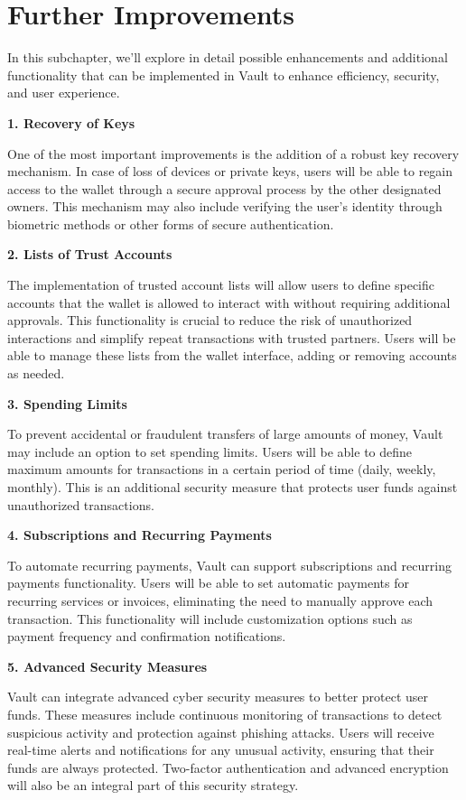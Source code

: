 \section{Further Improvements}
\label{ch4sec6}
In this subchapter, we'll explore in detail possible enhancements and additional functionality that can be implemented in Vault to enhance efficiency, security, and user experience.

\textbf{1. Recovery of Keys}

One of the most important improvements is the addition of a robust key recovery mechanism. In case of loss of devices or private keys, users will be able to regain access to the wallet through a secure approval process by the other designated owners. This mechanism may also include verifying the user's identity through biometric methods or other forms of secure authentication.

\textbf{2. Lists of Trust Accounts}

The implementation of trusted account lists will allow users to define specific accounts that the wallet is allowed to interact with without requiring additional approvals. This functionality is crucial to reduce the risk of unauthorized interactions and simplify repeat transactions with trusted partners. Users will be able to manage these lists from the wallet interface, adding or removing accounts as needed.

\textbf{3. Spending Limits}

To prevent accidental or fraudulent transfers of large amounts of money, Vault may include an option to set spending limits. Users will be able to define maximum amounts for transactions in a certain period of time (daily, weekly, monthly). This is an additional security measure that protects user funds against unauthorized transactions.

\textbf{4. Subscriptions and Recurring Payments}

To automate recurring payments, Vault can support subscriptions and recurring payments functionality. Users will be able to set automatic payments for recurring services or invoices, eliminating the need to manually approve each transaction. This functionality will include customization options such as payment frequency and confirmation notifications.

\textbf{5. Advanced Security Measures}

Vault can integrate advanced cyber security measures to better protect user funds. These measures include continuous monitoring of transactions to detect suspicious activity and protection against phishing attacks. Users will receive real-time alerts and notifications for any unusual activity, ensuring that their funds are always protected. Two-factor authentication and advanced encryption will also be an integral part of this security strategy.

